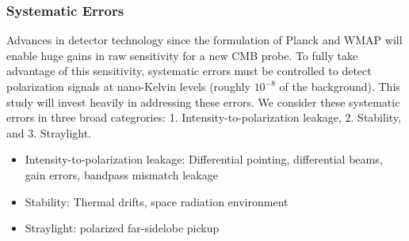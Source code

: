 \subsubsection{Systematic Errors}
Advances in detector technology since the formulation of Planck and WMAP will enable huge gains in raw sensitivity for a new CMB probe. To
fully take advantage of this sensitivity, systematic errors must be controlled to detect polarization signals at nano-Kelvin levels (roughly $10^{-8}$ of the background). 
This study will invest heavily in addressing these errors. 
We consider these systematic errors in three broad categrories: 1. Intensity-to-polarization leakage, 2. Stability, and 3. Straylight.

\begin{itemize}
\item Intensity-to-polarization leakage: Differential pointing,
  differential beams, gain errors, bandpass mismatch leakage
\item Stability: Thermal drifts, space radiation environment
\item Straylight: polarized far-sidelobe pickup
\end{itemize}

